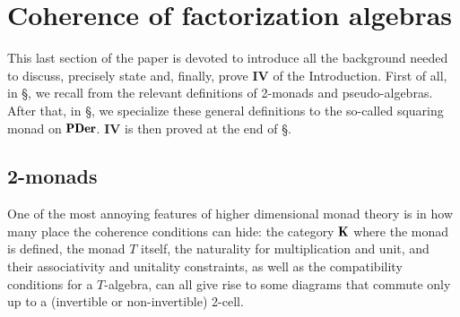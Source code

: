 \section{Coherence of factorization algebras}
\label{sec:thmB}

This last section of the paper is devoted to introduce all the background needed to discuss, precisely state and, finally, prove \athm \textbf{IV} of the Introduction. First of all, in §, we recall from \cite[§\textbf{1}]{lack2002codescent} the relevant definitions of 2-monads and pseudo-algebras. After that, in §, we specialize these general definitions to the so-called squaring monad on $\PDer$. \athm\@\textbf{IV} is then proved at the end of §.
 
\subsection{2-monads}\label{monads_subs}
One of the most annoying features of higher dimensional monad theory is in how many place the coherence conditions can hide: the category $\cate{K}$ where the monad is defined, the monad $T$ itself, the naturality for multiplication and unit, and their associativity and unitality constraints, as well as the compatibility conditions for a $T$\hyp{}algebra, can all give rise to some diagrams that commute only up to a (invertible or non\hyp{}invertible) 2-cell.

